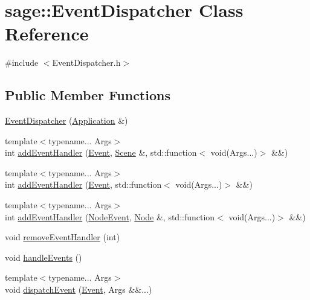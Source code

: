 \hypertarget{classsage_1_1EventDispatcher}{}\section{sage\+::Event\+Dispatcher Class Reference}
\label{classsage_1_1EventDispatcher}


{\ttfamily \#include $<$Event\+Dispatcher.\+h$>$}

\subsection*{Public Member Functions}
\begin{DoxyCompactItemize}
\item 
\mbox{\hyperlink{classsage_1_1EventDispatcher_aa80c440a5ba6379d084f616417ce0958}{Event\+Dispatcher}} (\mbox{\hyperlink{classsage_1_1Application}{Application}} \&)
\item 
{\footnotesize template$<$typename... Args$>$ }\\int \mbox{\hyperlink{classsage_1_1EventDispatcher_aeea139ba4798b0dd9409ca8367b0727e}{add\+Event\+Handler}} (\mbox{\hyperlink{namespacesage_afe706a25026cc74fe69b56d53a265d29}{Event}}, \mbox{\hyperlink{classsage_1_1Scene}{Scene}} \&, std\+::function$<$ void(Args...)$>$ \&\&)
\item 
{\footnotesize template$<$typename... Args$>$ }\\int \mbox{\hyperlink{classsage_1_1EventDispatcher_a871869f2a078e81c20a220a633d4e471}{add\+Event\+Handler}} (\mbox{\hyperlink{namespacesage_afe706a25026cc74fe69b56d53a265d29}{Event}}, std\+::function$<$ void(Args...)$>$ \&\&)
\item 
{\footnotesize template$<$typename... Args$>$ }\\int \mbox{\hyperlink{classsage_1_1EventDispatcher_a730d8eaf8806453d30dede2150b60071}{add\+Event\+Handler}} (\mbox{\hyperlink{namespacesage_ad2c7b0e1ebf67f572d43620e6b07aa13}{Node\+Event}}, \mbox{\hyperlink{classsage_1_1Node}{Node}} \&, std\+::function$<$ void(Args...)$>$ \&\&)
\item 
void \mbox{\hyperlink{classsage_1_1EventDispatcher_a79f655113b28c14ee6a86fa5ed7ec238}{remove\+Event\+Handler}} (int)
\item 
void \mbox{\hyperlink{classsage_1_1EventDispatcher_af94b0101f87f16334c1d32ea7a43c02a}{handle\+Events}} ()
\item 
{\footnotesize template$<$typename... Args$>$ }\\void \mbox{\hyperlink{classsage_1_1EventDispatcher_a096c6d68c684bb49ec1f8055c0e2a2d9}{dispatch\+Event}} (\mbox{\hyperlink{namespacesage_afe706a25026cc74fe69b56d53a265d29}{Event}}, Args \&\&...)

\end{DoxyCompactItemize}
